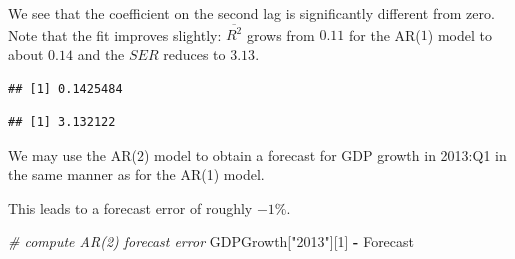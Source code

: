 \documentclass[]{book}
\newenvironment{Shaded}{\begin{snugshade}}{\end{snugshade}}
\newcommand{\KeywordTok}[1]{\textcolor[rgb]{0.13,0.29,0.53}{\textbf{#1}}}
\newcommand{\DecValTok}[1]{\textcolor[rgb]{0.00,0.00,0.81}{#1}}
\newcommand{\StringTok}[1]{\textcolor[rgb]{0.31,0.60,0.02}{#1}}
\newcommand{\CommentTok}[1]{\textcolor[rgb]{0.56,0.35,0.01}{\textit{#1}}}
\newcommand{\OperatorTok}[1]{\textcolor[rgb]{0.81,0.36,0.00}{\textbf{#1}}}
\newcommand{\NormalTok}[1]{#1}
\theoremstyle{definition}
\theoremstyle{definition}
\theoremstyle{definition}
\theoremstyle{remark}
\begin{document}
We see that the coefficient on the second lag is significantly different
from zero. Note that the fit improves slightly: \(\overline{R^2}\) grows
from \(0.11\) for the AR(\(1\)) model to about \(0.14\) and the \(SER\)
reduces to \(3.13\).

\begin{Shaded}
\end{Shaded}

\begin{verbatim}
## [1] 0.1425484
\end{verbatim}

\begin{Shaded}
\end{Shaded}

\begin{verbatim}
## [1] 3.132122
\end{verbatim}

We may use the AR(\(2\)) model to obtain a forecast for GDP growth in
2013:Q1 in the same manner as for the AR(1) model.

\begin{Shaded}
\end{Shaded}

This leads to a forecast error of roughly \(-1\%\).

\begin{Shaded}
\begin{Highlighting}[]
\CommentTok{# compute AR(2) forecast error }
\NormalTok{GDPGrowth[}\StringTok{"2013"}\NormalTok{][}\DecValTok{1}\NormalTok{] }\OperatorTok{-}\StringTok{ }\NormalTok{Forecast}
\end{Highlighting}
\end{Shaded}
\end{document}
